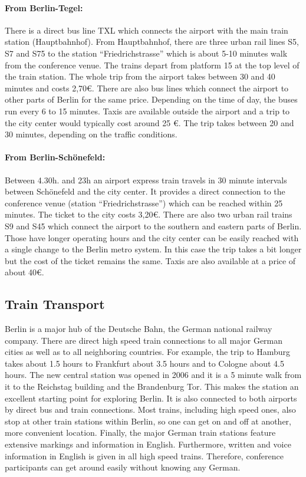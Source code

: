\paragraph{From Berlin-Tegel:} There is a direct bus line TXL which connects the airport with the main train station (Hauptbahnhof). From Hauptbahnhof, there are three urban rail lines S5, S7 and S75 to the station ``Friedrichstrasse'' which is about 5-10 minutes walk from the conference venue. The trains depart from platform 15 at the top level of the train station. The whole trip from the airport takes between 30 and 40 minutes and costs 2,70€. There are also bus lines which connect the airport to other parts of Berlin for the same price. Depending on the time of day, the buses run every 6 to 15 minutes. Taxis are available outside the airport and a trip to the city center would typically cost around 25 €. The trip takes between 20 and 30 minutes, depending on the traffic conditions.

\paragraph{From Berlin-Sch\"{o}nefeld:} Between 4.30h. and 23h an airport express train travels in 30 minute intervals between Sch\"{o}nefeld and the city center. It provides a direct connection to the conference venue (station ``Friedrichstrasse'') which can be reached within 25 minutes. The ticket to the city costs 3,20€. There are also two urban rail trains S9 and S45 which connect the airport to the southern and eastern parts of Berlin. Those have longer operating hours and the city center can be easily reached with a single change to the Berlin metro system. In this case the trip takes a bit longer but the cost of the ticket remains the same. Taxis are also available at a price of about 40€.

\subsection{Train Transport}

Berlin is a major hub of the Deutsche Bahn, the German national railway company. There are direct high speed train connections to all major German cities as well as to all neighboring countries. For example, the trip to Hamburg takes about 1.5 hours to Frankfurt about 3.5 hours and to Cologne about 4.5 hours. The new central station was opened in 2006 and it is a 5 minute walk from it to the Reichstag building and the Brandenburg Tor. This makes the station an excellent starting point for exploring Berlin. It is also connected to both airports by direct bus and train connections. Most trains, including high speed ones, also stop at other train stations within Berlin, so one can get on and off at another, more convenient location. Finally, the major German train stations feature extensive markings and information in English. Furthermore, written and voice information in English is given in all high speed trains. Therefore, conference participants can get around easily without knowing any German.

